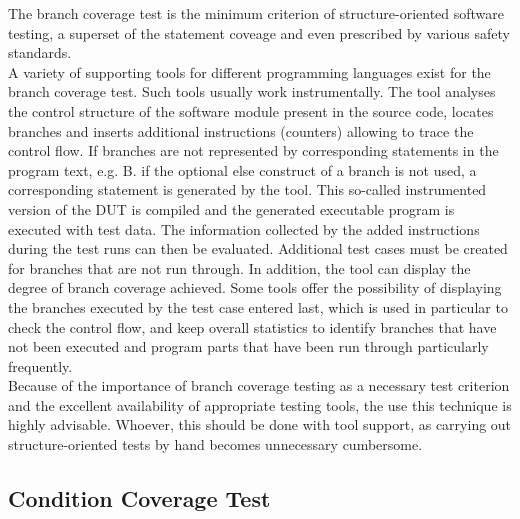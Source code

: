 	The branch coverage test is the minimum criterion of structure-oriented software testing, a superset of the statement coveage and even prescribed by various safety standards. \\
	A variety of supporting tools for different programming languages exist for the branch coverage test. Such tools usually work instrumentally. The tool analyses the control structure of the software module present in the source code, locates branches and inserts additional instructions (counters) allowing to trace the control flow. If branches are not represented by corresponding statements in the program text, e.g. B. if the optional else construct of a branch is not used, a corresponding statement is generated by the tool. This so-called instrumented version of the DUT is compiled and the generated executable program is executed with test data. The information collected by the added instructions during the test runs can then be evaluated. Additional test cases must be created for branches that are not run through. In addition, the tool can display the degree of branch coverage achieved. Some tools offer the possibility of displaying the branches executed by the test case entered last, which is used in particular to check the control flow, and keep overall statistics to identify branches that have not been executed and program parts that have been run through particularly frequently. \\
	Because of the importance of branch coverage testing as a necessary test criterion and the excellent availability of appropriate testing tools, the use this technique is highly advisable. Whoever, this should be done with tool support, as carrying out structure-oriented tests by hand becomes unnecessary cumbersome.

	\subsection{Condition Coverage Test}


